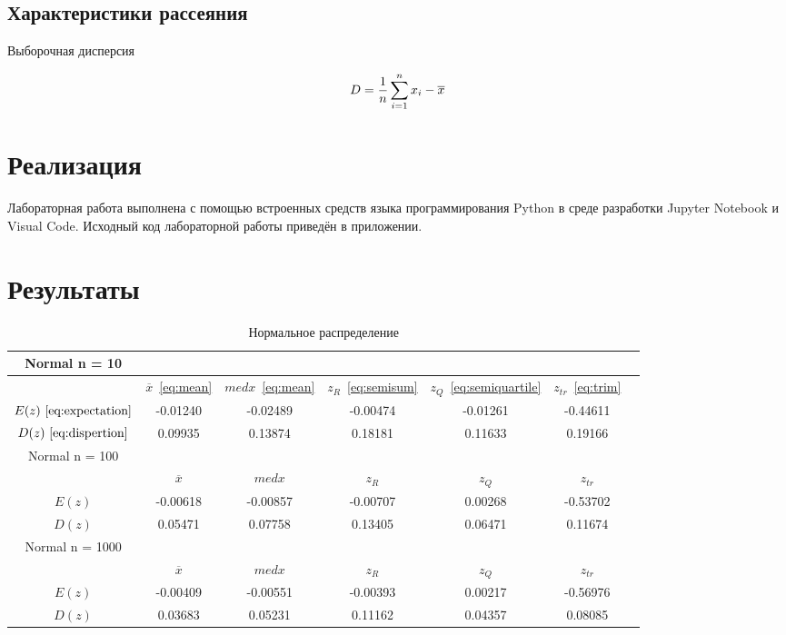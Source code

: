 \documentclass[12pt,a4paper]{scrartcl}
\begin{document}
\subsection{Характеристики рассеяния}
Выборочная дисперсия

\begin{equation}\label{eq:samplevariance}
\centering
D = \frac{1}{n} \sum_{i=1}^{n} x_i - \overline x
\end{equation}

\section {Реализация}
Лабораторная работа выполнена с помощью встроенных средств языка программирования Python в среде разработки Jupyter Notebook и Visual Code. Исходный код лабораторной
работы приведён в приложении.

\section {Результаты}

\begin{table}[H]
  \centering
  \begin{tabular}{ | c | c | c | c | c | c | c | }
	\hline
	Normal n = 10 & & & & &  \\ \hline
	& $\overline x$~\eqref{eq:mean} & $med x$~\eqref{eq:mean}& $z_R $~\eqref{eq:semisum} & $z_Q $~\eqref{eq:semiquartile}  &  $z_{tr}$~\eqref{eq:trim}  \\ \hline
	$E(z) ~\eqref{eq:expectation}$ & -0.01240 & -0.02489 & -0.00474 & -0.01261 & -0.44611 \\ \hline
	$D(z) ~\eqref{eq:dispertion}$ & 0.09935 & 0.13874 & 0.18181 & 0.11633 & 0.19166 \\ \hline
	
	Normal n = 100 & & & & &  \\ \hline
	& $\overline x$ & $med x$& $z_R $& $z_Q $&  $z_{tr}$\\ \hline
	$E(z)$ & -0.00618 & -0.00857 & -0.00707 & 0.00268 & -0.53702 \\ \hline
	$D(z)$ & 0.05471 & 0.07758 & 0.13405 & 0.06471 & 0.11674 \\ \hline
	
	Normal n = 1000 & & & & &  \\ \hline
	& $\overline x$ & $med x$& $z_R $& $z_Q $&  $z_{tr}$\\ \hline
	$E(z)$ & -0.00409 & -0.00551 & -0.00393 & 0.00217 &-0.56976 \\ \hline
	$D(z)$ & 0.03683 & 0.05231 & 0.11162 & 0.04357 & 0.08085 \\ \hline
	\end{tabular}
  \label{table:normal_table}
\caption{Нормальное распределение}
\end{table}
\end{document}
